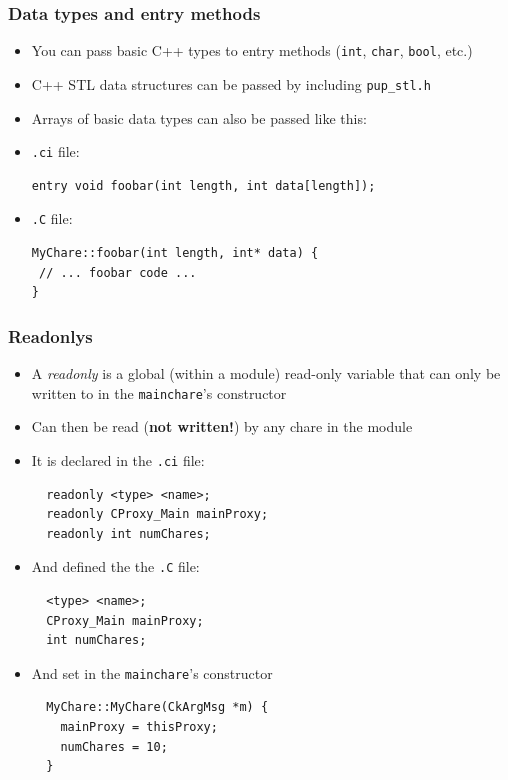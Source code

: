 \begin{frame}[fragile]
  \frametitle{Data types and entry methods}
\begin{itemize}
  \item You can pass basic C++ types to entry methods (\texttt{int},
    \texttt{char}, \texttt{bool}, etc.)
  \item C++ STL data structures can be passed by including \texttt{pup\_stl.h}
  \item Arrays of basic data types can also be passed like this:\\
  \item \texttt{.ci} file:
\begin{lstlisting}
entry void foobar(int length, int data[length]);
\end{lstlisting}
  \item \texttt{.C} file:
\begin{lstlisting}
MyChare::foobar(int length, int* data) {
 // ... foobar code ...
}
\end{lstlisting}
\end{itemize}
\end{frame}

\begin{frame}[fragile]
  \frametitle{Readonlys}
  \begin{itemize}
  \item A \textit{readonly} is a global (within a module) read-only variable
    that can only be written to in the \texttt{mainchare}'s constructor
  \item Can then be read (\textbf{not written!}) by any chare in the module
  \item It is declared in the \texttt{.ci} file:
  \begin{lstlisting}
  readonly <type> <name>;
  readonly CProxy_Main mainProxy;
  readonly int numChares;
  \end{lstlisting}
  \item And defined the the \texttt{.C} file:
  \begin{lstlisting}
  <type> <name>;
  CProxy_Main mainProxy;
  int numChares;
  \end{lstlisting}
  \item And set in the \texttt{mainchare}'s constructor
  \begin{lstlisting}
  MyChare::MyChare(CkArgMsg *m) {
    mainProxy = thisProxy;
    numChares = 10;
  }
\end{lstlisting}


\end{itemize}
\end{frame}



